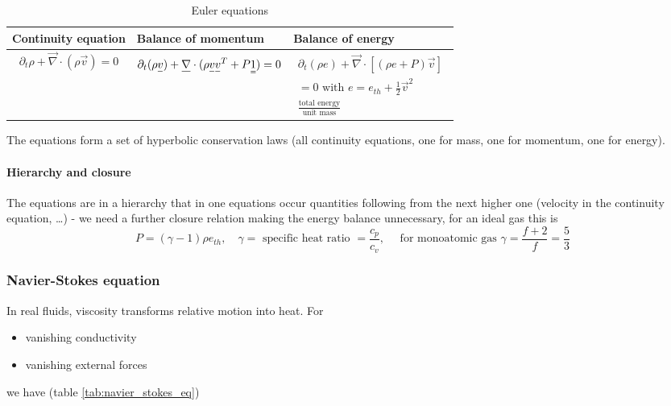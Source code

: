 \begin{table}[!htb]
    \centering
    \begin{tabular}{|p{}|p{}|p{}|}
        \hline
        \textcolor{blue1}{Continuity equation} & \textcolor{blue1}{Balance of momentum} &  \textcolor{blue1}{Balance of energy} \\
        \hline
        \begin{equation}
            \partial_t \rho + \vec{\nabla} \cdot (\rho \vec{v}) = 0
        \end{equation} &
        \begin{equation}
            \partial_t (\rho \vec{v}) + \vec{\nabla} \cdot (\rho \vec{v}\vec{v}^T + P\mat{1}) = 0
        \end{equation} &
        \begin{equation}
            \begin{gathered}
                \partial_t (\rho e) + \vec{\nabla} \cdot \left[(\rho e + P)\vec{v} \right]\\ = 0 
                \text{ with } e = e_{th} + \frac{1}{2} \vec{v}^2 \\
                \frac{\text{total energy}}{\text{unit mass}}
            \end{gathered}
        \end{equation} \\
        \hline
    \end{tabular}
    \caption{Euler equations}
    \label{tab:euler_eq}
\end{table}
The equations form a set of hyperbolic conservation laws (all continuity equations, one for mass, one for momentum, one for energy).
\paragraph{Hierarchy and closure} The equations are in a hierarchy that in one 
equations occur quantities following from the next higher one (velocity in the 
continuity equation, …) - we need a further closure relation making the energy 
balance unnecessary, for an ideal gas this is
\begin{equation}
    P = (\gamma - 1) \rho e_{th}, \quad \gamma = \text{ specific heat ratio } = \frac{c_p}{c_v}, \quad \text{ for monoatomic gas } \gamma = \frac{f+2}{f} = \frac{5}{3}
\end{equation}

\subsubsection{Navier-Stokes equation}
In real fluids, viscosity transforms relative motion into heat. For
\begin{itemize}
    \item vanishing conductivity
    \item vanishing external forces
\end{itemize}
we have (table \ref{tab:navier_stokes_eq})

